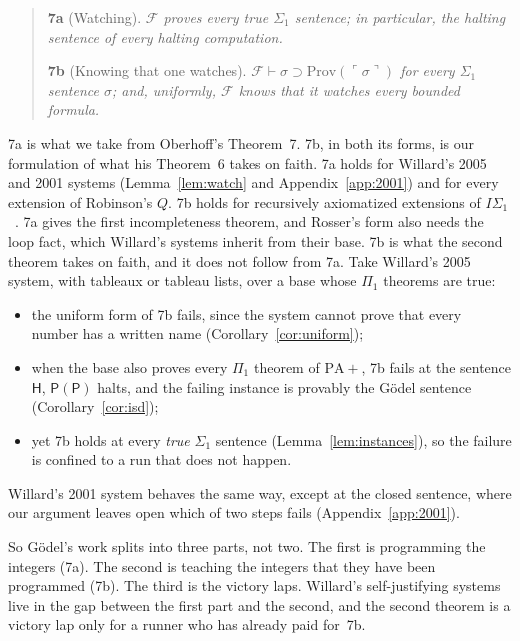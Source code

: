\documentclass[11pt]{article}
\newcommand{\F}{\mathcal{F}}
\newcommand{\G}{\ddot{\mathsf{G}}}          %
\newcommand{\Hs}{\mathsf{H}}                %
\newcommand{\Prog}[1]{\mathsf{#1}}
\newcommand{\fs}[1]{\ifmmode\text{\guillemotleft#1\guillemotright}\else\guillemotleft#1\guillemotright\fi}
\newcommand{\Prov}{\mathrm{Prov}}
\newcommand{\gn}[1]{\ulcorner #1\urcorner}  %
\theoremstyle{plain}
\theoremstyle{definition}
\begin{document}
\begin{quote}
\textbf{7a} (Watching). \emph{$\F$ proves every true $\Sigma_1$ sentence; in
particular, the halting sentence of every halting computation.}

\textbf{7b} (Knowing that one watches). \emph{$\F \vdash \sigma \supset
\Prov(\gn{\sigma})$ for every $\Sigma_1$ sentence $\sigma$; and, uniformly,
$\F$ knows that it watches every bounded formula.}
\end{quote}

\noindent
7a is what we take from Oberhoff's Theorem~7. 7b, in both its forms, is our
formulation of what his Theorem~6 takes on faith. 7a holds for Willard's
2005 and 2001 systems (Lemma~\ref{lem:watch} and Appendix~\ref{app:2001}) and
for every extension of Robinson's $Q$. 7b holds for recursively axiomatized
extensions of $I\Sigma_1$~\cite{hp93}. 7a gives the first incompleteness
theorem, and Rosser's form also needs the loop fact, which Willard's systems
inherit from their base. 7b is what the second theorem takes on faith, and
it does not follow from 7a. Take Willard's 2005 system, with tableaux or
tableau lists, over a base whose $\Pi_1$ theorems are true:
\begin{itemize}[leftmargin=1.5em]
\item the uniform form of 7b fails, since the system cannot prove that every
  number has a written name (Corollary~\ref{cor:uniform});
\item when the base also proves every $\Pi_1$ theorem of $\mathrm{PA}{+}$,
  7b fails at the sentence $\Hs$, \fs{$\Prog{P}(\Prog{P})$ halts}, and the
  failing instance is provably the Gödel sentence (Corollary~\ref{cor:isd});
\item yet 7b holds at every \emph{true} $\Sigma_1$ sentence
  (Lemma~\ref{lem:instances}), so the failure is confined to a run that does
  not happen.
\end{itemize}
Willard's 2001 system behaves the same way, except at the closed sentence,
where our argument leaves open which of two steps fails
(Appendix~\ref{app:2001}).

So Gödel's work splits into three parts, not two. The first is programming
the integers (7a). The second is teaching the integers that they have been
programmed (7b). The third is the victory laps. Willard's self-justifying
systems live in the gap between the first part and the second, and the
second theorem is a victory lap only for a runner who has already paid
for~7b.
\end{document}
